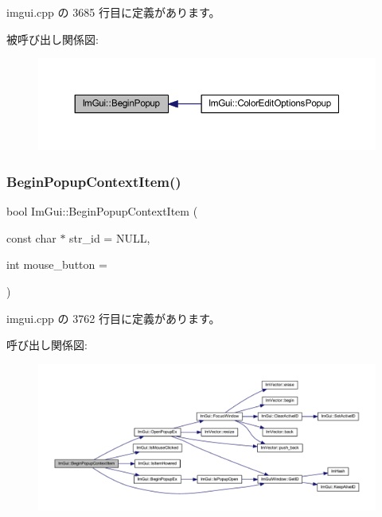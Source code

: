  imgui.\+cpp の 3685 行目に定義があります。

被呼び出し関係図\+:\nopagebreak
\begin{figure}[H]
\begin{center}
\leavevmode
\includegraphics[width=350pt]{namespace_im_gui_ab71527de4b52ff970e5396040302e134_icgraph}
\end{center}
\end{figure}
\mbox{\label{namespace_im_gui_a579fc507f5b5d164c8fd628aee3d7bbd}} 
\subsubsection{\texorpdfstring{Begin\+Popup\+Context\+Item()}{BeginPopupContextItem()}}
{\footnotesize\ttfamily bool Im\+Gui\+::\+Begin\+Popup\+Context\+Item (\begin{DoxyParamCaption}\item[{const char $\ast$}]{str\+\_\+id = {\ttfamily NULL},  }\item[{int}]{mouse\+\_\+button = {} }\end{DoxyParamCaption})}



 imgui.\+cpp の 3762 行目に定義があります。

呼び出し関係図\+:\nopagebreak
\begin{figure}[H]
\begin{center}
\leavevmode
\includegraphics[width=350pt]{namespace_im_gui_a579fc507f5b5d164c8fd628aee3d7bbd_cgraph}
\end{center}
\end{figure}
\mbox{\label{namespace_im_gui_a87a2228929503fff067d2e167a690751}} 
